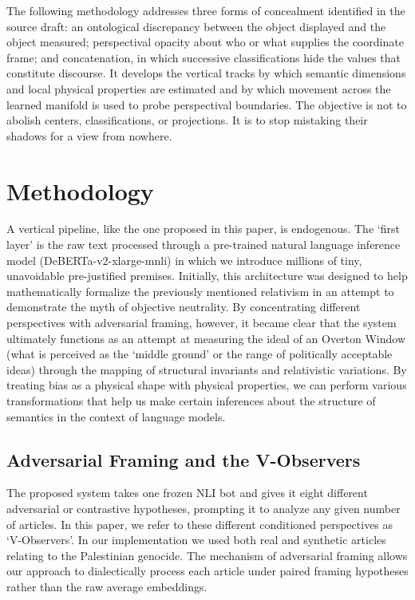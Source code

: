 The following methodology addresses three forms of concealment identified in the source draft: an ontological discrepancy between the object displayed and the object measured; perspectival opacity about who or what supplies the coordinate frame; and concatenation, in which successive classifications hide the values that constitute discourse. It develops the vertical tracks by which semantic dimensions and local physical properties are estimated and by which movement across the learned manifold is used to probe perspectival boundaries. The objective is not to abolish centers, classifications, or projections. It is to stop mistaking their shadows for a view from nowhere.




\section{Methodology}

A vertical pipeline, like the one proposed in this paper, is endogenous. The `first layer' is the raw text processed through a pre-trained natural language inference model (DeBERTa-v2-xlarge-mnli) in which we introduce millions of tiny, unavoidable pre-justified premises. Initially, this architecture was designed to help mathematically formalize the previously mentioned relativism in an attempt to demonstrate the myth of objective neutrality. By concentrating different perspectives with adversarial framing, however, it became clear that the system ultimately functions as an attempt at measuring the ideal of an Overton Window (what is perceived as the `middle ground' or the range of politically acceptable ideas) through the mapping of structural invariants and relativistic variations. By treating bias as a physical shape with physical properties, we can perform various transformations that help us make certain inferences about the structure of semantics in the context of language models.

\subsection{Adversarial Framing and the V-Observers}

The proposed system takes one frozen NLI bot and gives it eight different adversarial or contrastive hypotheses, prompting it to analyze any given number of articles. In this paper, we refer to these different conditioned perspectives as `V-Observers'. In our implementation we used both real and synthetic articles relating to the Palestinian genocide. The mechanism of adversarial framing allows our approach to dialectically process each article under paired framing hypotheses rather than the raw average embeddings. 

